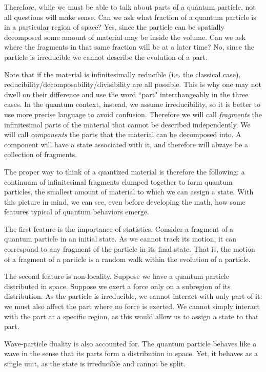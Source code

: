 \documentclass[smallextended]{svjour3}
\numberwithin{equation}{section}
\theoremstyle{definition}
\begin{document}
Therefore, while we must be able to talk about parts of a quantum particle, not all questions will make sense. Can we ask what fraction of a quantum particle is in a particular region of space? Yes, since the particle can be spatially decomposed some amount of material may be inside the volume. Can we ask where the fragments in that same fraction will be at a later time? No, since the particle is irreducible we cannot describe the evolution of a part.

Note that if the material is infinitesimally reducible (i.e. the classical case), reducibility/decomposability/divisibility are all possible. This is why one may not dwell on their difference and use the word ``part" interchangeably in the three cases. In the quantum context, instead, we assume irreducibility, so it is better to use more precise language to avoid confusion. Therefore we will call \emph{fragments} the infinitesimal parts of the material that cannot be described independently. We will call \emph{components} the parts that the material can be decomposed into. A component will have a state associated with it, and therefore will always be a collection of fragments.

The proper way to think of a quantized material is therefore the following: a continuum of infinitesimal fragments clumped together to form quantum particles, the smallest amount of material to which we can assign a state. With this picture in mind, we can see, even before developing the math, how some features typical of quantum behaviors emerge.

The first feature is the importance of statistics. Consider a fragment of a quantum particle in an initial state. As we cannot track its motion, it can correspond to any fragment of the particle in its final state. That is, the motion of a fragment of a particle is a random walk within the evolution of a particle.

The second feature is non-locality. Suppose we have a quantum particle distributed in space. Suppose we exert a force only on a subregion of its distribution. As the particle is irreducible, we cannot interact with only part of it: we must also affect the part where no force is exerted. We cannot simply interact with the part at a specific region, as this would allow us to assign a state to that part.

Wave-particle duality is also accounted for. The quantum particle behaves like a wave in the sense that its parts form a distribution in space. Yet, it behaves as a single unit, as the state is irreducible and cannot be split.
\end{document}
